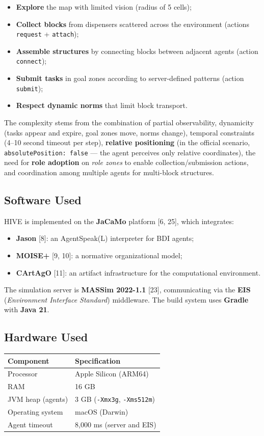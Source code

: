\documentclass[11pt,a4paper]{article}
\newcommand{\code}[1]{\texttt{#1}}
\begin{document}
\begin{itemize}
  \item \textbf{Explore} the map with limited vision (radius of 5 cells);
  \item \textbf{Collect blocks} from dispensers scattered across the environment (actions \code{request} + \code{attach});
  \item \textbf{Assemble structures} by connecting blocks between adjacent agents (action \code{connect});
  \item \textbf{Submit tasks} in goal zones according to server-defined patterns (action \code{submit});
  \item \textbf{Respect dynamic norms} that limit block transport.
\end{itemize}

The complexity stems from the combination of partial observability, dynamicity (tasks appear and expire, goal zones move, norms change), temporal constraints (4--10 second timeout per step), \textbf{relative positioning} (in the official scenario, \code{absolutePosition: false} --- the agent perceives only relative coordinates), the need for \textbf{role adoption} on \emph{role zones} to enable collection/submission actions, and coordination among multiple agents for multi-block structures.

\subsection{Software Used}
HIVE is implemented on the \textbf{JaCaMo} platform [6, 25], which integrates:
\begin{itemize}
  \item \textbf{Jason} [8]: an AgentSpeak(L) interpreter for BDI agents;
  \item \textbf{MOISE+} [9, 10]: a normative organizational model;
  \item \textbf{CArtAgO} [11]: an artifact infrastructure for the computational environment.
\end{itemize}
The simulation server is \textbf{MASSim 2022-1.1} [23], communicating via the \textbf{EIS} (\emph{Environment Interface Standard}) middleware. The build system uses \textbf{Gradle} with \textbf{Java 21}.

\subsection{Hardware Used}
\begin{table}[H]
\centering
\begin{tabularx}{\linewidth}{lX}
\toprule
\textbf{Component} & \textbf{Specification} \\
\midrule
Processor & Apple Silicon (ARM64) \\
RAM & 16 GB \\
JVM heap (agents) & 3 GB (\code{-Xmx3g}, \code{-Xms512m}) \\
Operating system & macOS (Darwin) \\
Agent timeout & 8{,}000 ms (server and EIS) \\
\bottomrule
\end{tabularx}
\end{table}
\end{document}
